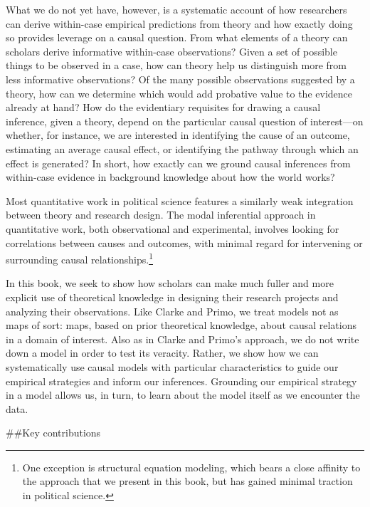 \documentclass[12pt,]{book}
\let\rmarkdownfootnote\footnote%
\def\footnote{\protect\rmarkdownfootnote}
\begin{document}
What we do not yet have, however, is a systematic account of how researchers can derive within-case empirical predictions from theory and how exactly doing so provides leverage on a causal question. From what elements of a theory can scholars derive informative within-case observations? Given a set of possible things to be observed in a case, how can theory help us distinguish more from less informative observations? Of the many possible observations suggested by a theory, how can we determine which would add probative value to the evidence already at hand? How do the evidentiary requisites for drawing a causal inference, given a theory, depend on the particular causal question of interest---on whether, for instance, we are interested in identifying the cause of an outcome, estimating an average causal effect, or identifying the pathway through which an effect is generated? In short, how exactly can we ground causal inferences from within-case evidence in background knowledge about how the world works?

Most quantitative work in political science features a similarly weak integration between theory and research design. The modal inferential approach in quantitative work, both observational and experimental, involves looking for correlations between causes and outcomes, with minimal regard for intervening or surrounding causal relationships.\footnote{One exception is structural equation modeling, which bears a close affinity to the approach that we present in this book, but has gained minimal traction in political science.}

In this book, we seek to show how scholars can make much fuller and more explicit use of theoretical knowledge in designing their research projects and analyzing their observations. Like Clarke and Primo, we treat models not as maps of sort: maps, based on prior theoretical knowledge, about causal relations in a domain of interest. Also as in Clarke and Primo's approach, we do not write down a model in order to test its veracity. Rather, we show how we can systematically use causal models with particular characteristics to guide our empirical strategies and inform our inferences. Grounding our empirical strategy in a model allows us, in turn, to learn about the model itself as we encounter the data.

\#\#Key contributions
\end{document}
